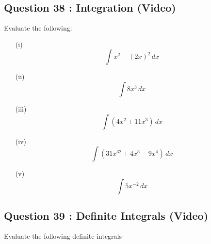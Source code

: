 \documentclass[]{article}
\begin{document}
\subsection*{Question 38 : Integration (Video)}
Evaluate the following:
\begin{multicols}{2}
	\begin{itemize}
		
		\item[(i)] \[\int x^2-(2x)^{2}\, dx\]
		\item[(ii)] \[\int 8x^3\, dx\]
		\item[(iii)]\[ \int (4x^2+11x^3)\, dx\]
		\item[(iv)] \[\int (31x^{32}+4x^3-9x^4) \,dx\]
		\item[(v)] \[\int 5x^{-2}\, dx\]
	\end{itemize}
\end{multicols}









\subsection*{Question 39 : Definite Integrals (Video)}
Evaluate the following definite integrals 
\end{document}
